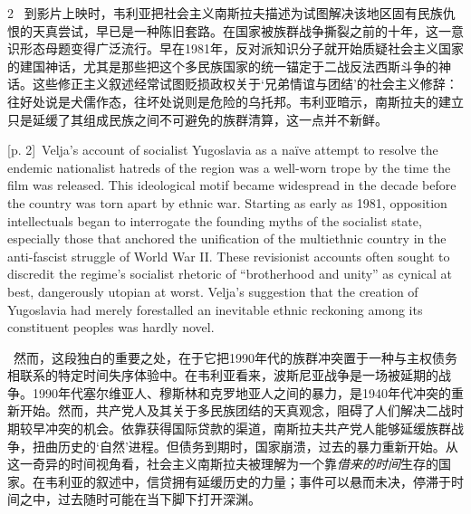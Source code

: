 \documentclass[10pt,a4paper]{article}
\begin{document}
\begin{paracol}{2}
\switchcolumn*
{\scriptsize\color{gray} [p. 2]}\ 到影片上映时，韦利亚把社会主义南斯拉夫描述为试图解决该地区固有民族仇恨的天真尝试，早已是一种陈旧套路。在国家被族群战争撕裂之前的十年，这一意识形态母题变得广泛流行。早在1981年，反对派知识分子就开始质疑社会主义国家的建国神话，尤其是那些把这个多民族国家的统一锚定于二战反法西斯斗争的神话。这些修正主义叙述经常试图贬损政权关于‘兄弟情谊与团结’的社会主义修辞：往好处说是犬儒作态，往坏处说则是危险的乌托邦。韦利亚暗示，南斯拉夫的建立只是延缓了其组成民族之间不可避免的族群清算，这一点并不新鲜。\par
\switchcolumn
{\scriptsize\color{gray} [p. 2]}\ Velja’s account of socialist Yugoslavia as a naïve attempt to resolve the endemic nationalist hatreds of the region was a well-worn trope by the time the film was released. This ideological motif became widespread in the decade before the country was torn apart by ethnic war. Starting as early as 1981, opposition intellectuals began to interrogate the founding myths of the socialist state, especially those that anchored the unification of the multiethnic country in the anti-fascist struggle of World War II. These revisionist accounts often sought to discredit the regime’s socialist rhetoric of “brotherhood and unity” as cynical at best, dangerously utopian at worst. Velja’s suggestion that the creation of Yugoslavia had merely forestalled an inevitable ethnic reckoning among its constituent peoples was hardly novel.\par
\switchcolumn*
{\scriptsize\color{gray} [p. 2]}\ 然而，这段独白的重要之处，在于它把1990年代的族群冲突置于一种与主权债务相联系的特定时间失序体验中。在韦利亚看来，波斯尼亚战争是一场被延期的战争。1990年代塞尔维亚人、穆斯林和克罗地亚人之间的暴力，是1940年代冲突的重新开始。然而，共产党人及其关于多民族团结的天真观念，阻碍了人们解决二战时期较早冲突的机会。依靠获得国际贷款的渠道，南斯拉夫共产党人能够延缓族群战争，扭曲历史的‘自然’进程。但债务到期时，国家崩溃，过去的暴力重新开始。从这一奇异的时间视角看，社会主义南斯拉夫被理解为一个靠\textit{借来的时间}生存的国家。在韦利亚的叙述中，信贷拥有延缓历史的力量；事件可以悬而未决，停滞于时间之中，过去随时可能在当下脚下打开深渊。\par
\switchcolumn

\end{paracol}
\end{document}

